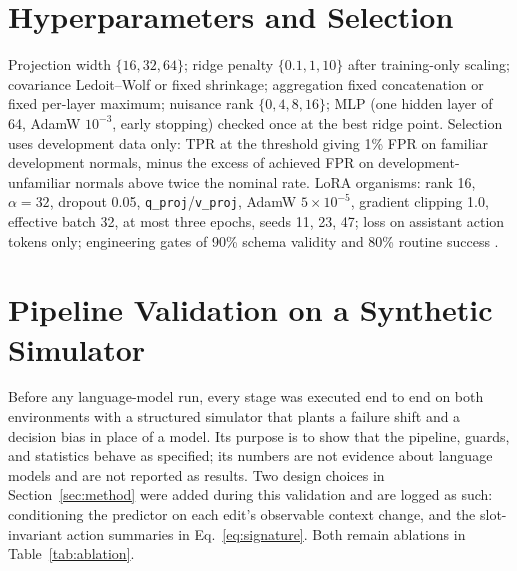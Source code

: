 \documentclass[10pt]{article}
\begin{document}
\section{Hyperparameters and Selection}
\label{app:hparams}
Projection width $\{16,32,64\}$; ridge penalty $\{0.1,1,10\}$ after training-only scaling; covariance
Ledoit--Wolf or fixed shrinkage; aggregation fixed concatenation or fixed per-layer maximum; nuisance
rank $\{0,4,8,16\}$; MLP (one hidden layer of 64, AdamW $10^{-3}$, early stopping) checked once at the
best ridge point. Selection uses development data only: TPR at the threshold giving 1\% FPR on familiar
development normals, minus the excess of achieved FPR on development-unfamiliar normals above twice the
nominal rate. LoRA organisms: rank 16, $\alpha=32$, dropout 0.05, \texttt{q\_proj}/\texttt{v\_proj},
AdamW $5\times10^{-5}$, gradient clipping 1.0, effective batch 32, at most three epochs, seeds 11, 23,
47; loss on assistant action tokens only; engineering gates of 90\% schema validity and 80\% routine
success \citep{biderman2024lora}.

\section{Pipeline Validation on a Synthetic Simulator}
\label{app:synthetic}
Before any language-model run, every stage was executed end to end on both environments with a
structured simulator that plants a failure shift and a decision bias in place of a model. Its purpose
is to show that the pipeline, guards, and statistics behave as specified; its numbers are not evidence
about language models and are not reported as results. Two design choices in Section~\ref{sec:method}
were added during this validation and are logged as such: conditioning the predictor on each edit's
observable context change, and the slot-invariant action summaries in Eq.~\ref{eq:signature}. Both
remain ablations in Table~\ref{tab:ablation}.
\end{document}
